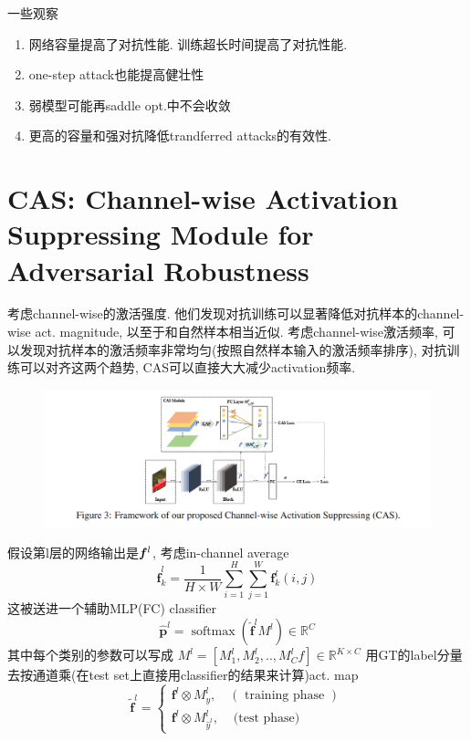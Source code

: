 \documentclass{article}
\begin{document}
一些观察
\begin{enumerate}
    \item 网络容量提高了对抗性能. 训练超长时间提高了对抗性能.
    \item one-step attack也能提高健壮性
    \item 弱模型可能再saddle opt.中不会收敛
    \item 更高的容量和强对抗降低trandferred attacks的有效性.
\end{enumerate}

\section{CAS: Channel-wise Activation Suppressing Module for Adversarial Robustness}

考虑channel-wise的激活强度. 他们发现对抗训练可以显著降低对抗样本的channel-wise act. magnitude, 以至于和自然样本相当近似. 考虑channel-wise激活频率, 可以发现对抗样本的激活频率非常均匀(按照自然样本输入的激活频率排序), 对抗训练可以对齐这两个趋势, CAS可以直接大大减少activation频率.

\begin{figure}[htbp]
    \centering
    \includegraphics[width=\textwidth]{cas-arch.PNG}
\end{figure}

假设第l层的网络输出是$\boldsymbol{f}^l$, 考虑in-channel average
\begin{equation}
    \hat{\boldsymbol{f}}_{k}^{l}=\frac{1}{H \times W} \sum_{i=1}^{H} \sum_{j=1}^{W} \boldsymbol{f}_{k}^{l}(i, j)
\end{equation}
这被送进一个辅助MLP(FC) classifier
\begin{equation}
    \hat{\boldsymbol{p}}^{l}=\operatorname{softmax}\left(\hat{\boldsymbol{f}}^{l} M^{l}\right) \in \mathbb{R}^{C}
\end{equation}
其中每个类别的参数可以写成
$M^{l}=\left[M_{1}^{l}, M_{2}^{l}, . ., M_{C}^{l}f\right] \in \mathbb{R}^{K \times C}$
用GT的label分量去按通道乘(在test set上直接用classifier的结果来计算)act. map
\begin{equation}
    \tilde{\boldsymbol{f}}^{l}=\left\{\begin{array}{ll}
    \boldsymbol{f}^{l} \otimes M_{y}^{l}, & (\text { training phase }) \\
    \boldsymbol{f}^{l} \otimes M_{\hat{y}^{l}}^{l}, & \text { (test phase) }
    \end{array}\right.
\end{equation}
\end{document}
